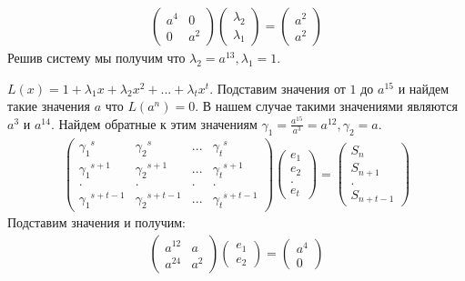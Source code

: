 \documentclass[12pt]{article}
\begin{document}
\begin{gather}
    \begin{pmatrix}
        a^{4} & 0     \\
        0     & a^{2}
    \end{pmatrix}
    \begin{pmatrix}
        \lambda_{2} \\
        \lambda_{1}
    \end{pmatrix}
    =
    \begin{pmatrix}
        a^2 \\
        a^2
    \end{pmatrix}
\end{gather}
Решив систему мы получим что $\lambda_{2} = a^{13}, \lambda_{1} = 1$.\par
$L(x) = 1 + \lambda_{1}x + \lambda_{2}x^2 + ... + \lambda_{t}x^{t}$.
Подставим значения от $1$ до $a^{15}$ и найдем такие значения $a$ что $L(a^{n}) = 0$.
В нашем случае такими значениями являются $a^3$ и $a^{14}$.
Найдем обратные к этим значениям $\gamma_{1} = \frac{a^{15}}{a^{3}} = a^{12}, \gamma_{2} = a$.
\begin{gather}
    \begin{pmatrix}
        {\gamma_{1}}^{s}     & {\gamma_{2}}^{s}     & {...} & {\gamma_{t}}^{s}     \\
        {\gamma_{1}}^{s+1}   & {\gamma_{2}}^{s+1}   & {...} & {\gamma_{t}}^{s+1}   \\
        {.}                  & {.}                  & {.}   & {.}                  \\
        {\gamma_{1}}^{s+t-1} & {\gamma_{2}}^{s+t-1} & {...} & {\gamma_{t}}^{s+t-1}
    \end{pmatrix}
    \begin{pmatrix}
        e_{1} \\
        e_{2} \\
        {.}   \\
        e_{t}
    \end{pmatrix}
    =
    \begin{pmatrix}
        S_{n}   \\
        S_{n+1} \\
        {.}     \\
        S_{n+t-1}
    \end{pmatrix}
\end{gather}
Подставим значения и получим:
\begin{gather}
    \begin{pmatrix}
        a^{12} & a     \\
        a^{24} & a^{2}
    \end{pmatrix}
    \begin{pmatrix}
        e_{1} \\
        e_{2}
    \end{pmatrix}
    =
    \begin{pmatrix}
        a^{4} \\
        0
    \end{pmatrix}
\end{gather}
\end{document}

